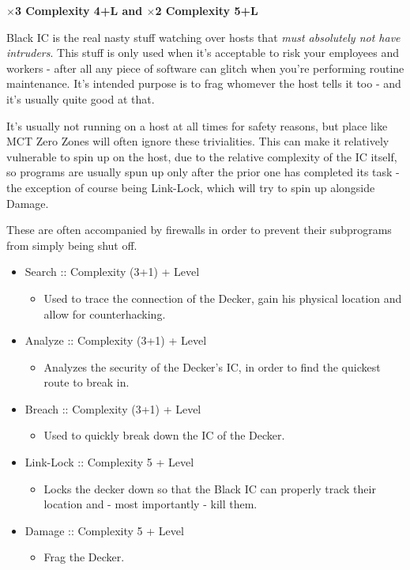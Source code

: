 \begin{multicols}{2}
	\textbf{$\times$3 Complexity 4+L and $\times$2 Complexity 5+L}
	
	Black IC is the real nasty stuff watching over hosts that \textit{must absolutely not have intruders}. This stuff is only used when it's acceptable to risk your employees and workers - after all any piece of software can glitch when you're performing routine maintenance. It's intended purpose is to frag whomever the host tells it too - and it's usually quite good at that.
	
	It's usually not running on a host at all times for safety reasons, but place like MCT Zero Zones will often ignore these trivialities. This can make it relatively vulnerable to spin up on the host, due to the relative complexity of the IC itself, so programs are usually spun up only after the prior one has completed its task - the exception of course being Link-Lock, which will try to spin up alongside Damage.
	
	These are often accompanied by firewalls in order to prevent their subprograms from simply being shut off.
	
	\begin{itemize}
		\itemsep 0pt
		\item Search :: Complexity (3+1) + Level
		\begin{itemize}
			\itemsep 0pt
			\item Used to trace the connection of the Decker, gain his physical location and allow for counterhacking.
		\end{itemize}
		\item Analyze :: Complexity (3+1) + Level
		\begin{itemize}
			\itemsep 0pt
			\item Analyzes the security of the Decker's IC, in order to find the quickest route to break in.
		\end{itemize}
		\item Breach :: Complexity (3+1) + Level
		\begin{itemize}
			\itemsep 0pt
			\item Used to quickly break down the IC of the Decker.
		\end{itemize}
		\item Link-Lock :: Complexity 5 + Level
		\begin{itemize}
			\itemsep 0pt
			\item Locks the decker down so that the Black IC can properly track their location and - most importantly - kill them.
		\end{itemize}
		\item Damage :: Complexity 5 + Level
		\begin{itemize}
			\itemsep 0pt
			\item Frag the Decker.
		\end{itemize}				
	\end{itemize}
	

\end{multicols}

